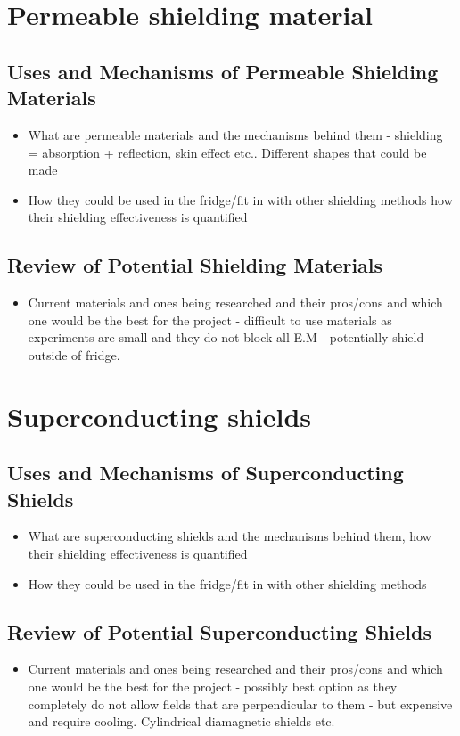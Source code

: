 \documentclass[a4paper,12pt]{article}
\begin{document}
\section{Permeable shielding material}
\subsection{Uses and Mechanisms of Permeable Shielding Materials}
\begin{itemize}
\item What are permeable materials and the mechanisms behind them - shielding =  absorption + reflection, skin effect etc.. Different shapes that could be made
\item How they could be used in the fridge/fit in with other shielding methods how their shielding effectiveness is quantified
\end{itemize}
\subsection{Review of Potential Shielding Materials}
\begin{itemize}
\item Current materials and ones being researched and their pros/cons and which one would be the best for the project - difficult to use materials as experiments are small and they do not block all E.M - potentially shield outside of fridge. 
\end{itemize}

\section{Superconducting shields}
\subsection{Uses and Mechanisms of Superconducting Shields}
\begin{itemize}
\item What are superconducting shields and the mechanisms behind them, how their shielding effectiveness is quantified
\item How they could be used in the fridge/fit in with other shielding methods
\end{itemize}
\subsection{Review of Potential Superconducting Shields}
\begin{itemize}

\item Current materials and ones being researched and their pros/cons and which one would be the best for the project - possibly best option as they completely do not allow fields that are perpendicular to them - but expensive and require cooling. Cylindrical diamagnetic shields etc. 
\end{itemize}
\end{document}
